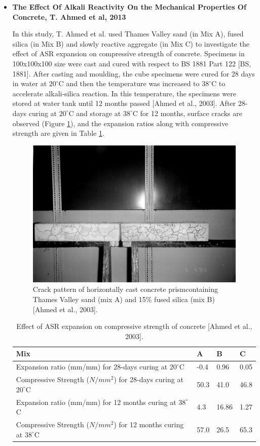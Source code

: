 \begin{itemize}
    \item
    \textbf{The Effect Of Alkali Reactivity On the Mechanical Properties Of Concrete, T. Ahmed et al, 2013}

    In this study, T. Ahmed et al. used Thames Valley sand (in Mix A), fused silica (in Mix B) and slowly reactive aggregate (in Mix C) to investigate the effect of ASR expansion on compressive strength of concrete. Specimens in 100x100x100 size were cast and cured with respect to BS 1881 Part 122 [BS, 1881]. After casting and moulding, the cube specimens were cured for 28 days in water at $20^\circ$C and then the temperature was increased to $38^\circ$C to accelerate alkali-silica reaction. In this temperature, the specimens were stored at water tank until 12 months passed [Ahmed et al., 2003]. After 28-days curing at $20^\circ$C and storage at $38^\circ$C for 12 months, surface cracks are observed (Figure \ref{fig:T.Ahmed_crack}), and the expansion ratios along with compressive strength are given in Table \ref{table:Ahmed et al.}.

    \begin{figure}[ht!]
        \centering
        \includegraphics[width=.6\linewidth]{Files/Background/Ahmed_crack.png}
        \caption{Crack pattern of horizontally cast concrete prismcontaining Thames Valley sand (mix A) and 15\% fused silica (mix B) [Ahmed et al., 2003].}
        \label{fig:T.Ahmed_crack}
    \end{figure}

    \begin{table}[ht!]
        \centering
            \begin{tabular}{ |p{6cm}|p{1.5cm}|p{1.5cm}|p{1.5cm}| }
             \hline
             Mix &  A & B & C  \\ [0.5ex]
             \hline
             Expansion ratio (mm/mm) for 28-days curing at $20^\circ$C & -0.4 & 0.96 & 0.05 \\
             \hline
             Compressive Strength ($N/mm^2$) for 28-days curing at $20^\circ$C & 50.3 & 41.0 & 46.8 \\
             \hline
             Expansion ratio (mm/mm) for 12 months curing at $38^\circ$C & 4.3 & 16.86 & 1.27 \\
             \hline
             Compressive Strength ($N/mm^2$) for 12 months curing at $38^\circ$C & 57.0 & 26.5 & 65.3 \\ [0.5ex]
             \hline
            \end{tabular}
        \caption{Effect of ASR expansion on compressive strength of concrete [Ahmed et al., 2003].}
        \label{table:Ahmed et al.}
    \end{table}



\end{itemize}

